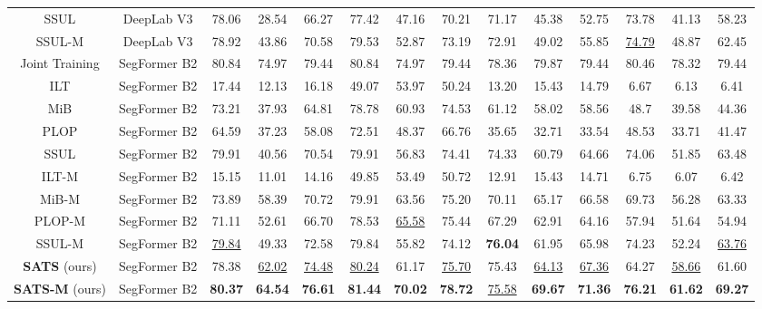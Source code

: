 \documentclass[onecolumn,conference,compsoc]{IEEEtran}
\begin{document}
\begin{spacing}{1.5}
\begin{table*}[t]
{\begin{tabular}{ c|c|ccc|ccc|ccc|ccc }
SSUL \cite{SSUL} & DeepLab V3 & 78.06 & 28.54 & 66.27 & 77.42 & 47.16 & 70.21 & 71.17 & 45.38 & 52.75 & 73.78 & 41.13 & 58.23\\
SSUL-M \cite{SSUL} & DeepLab V3 & 78.92 & 43.86 & 70.58 & 79.53 & 52.87 & 73.19 & 72.91 & 49.02 & 55.85 & \underline{74.79} & 48.87 & 62.45 \\
\midrule
Joint Training & SegFormer B2 & 80.84 & 74.97 & 79.44 & 80.84 & 74.97 & 79.44 & 78.36
& 79.87 & 79.44 & 80.46 & 78.32 & 79.44 \\
ILT \cite{ILT} & SegFormer B2 & 17.44 & 12.13 & 16.18 & 49.07 & 53.97 & 50.24 & 13.20 & 15.43 & 14.79 & 6.67 & 6.13 & 6.41 \\
MiB \cite{MiB} & SegFormer B2 & 73.21 & 37.93 & 64.81 & 78.78 & 60.93 & 74.53 & 61.12 & 58.02 & 58.56 & 48.7 & 39.58 & 44.36 \\
PLOP \cite{PLOP} & SegFormer B2 & 64.59 & 37.23 & 58.08 & 72.51 & 48.37 & 66.76 & 35.65 & 32.71 & 33.54 & 48.53 & 33.71 & 41.47 \\ 
SSUL \cite{SSUL} & SegFormer B2 & 79.91 & 40.56 & 70.54 & 79.91 & 56.83 & 74.41 & 74.33 & 60.79 & 64.66 & 74.06 & 51.85 & 63.48 \\
\midrule
ILT-M & SegFormer B2 & 15.15 & 11.01 & 14.16 & 49.85 & 53.49 & 50.72 & 12.91 & 15.43 & 14.71 & 6.75 & 6.07 & 6.42\\
MiB-M & SegFormer B2 & 73.89 & 58.39 & 70.72 & 79.91 & 63.56 & 75.20 & 70.11 & 65.17 & 66.58 & 69.73 & 56.28 & 63.33\\
PLOP-M & SegFormer B2 & 71.11 & 52.61 & 66.70 & 78.53 & \underline{65.58} & 75.44 & 67.29 & 62.91 & 64.16 & 57.94 & 51.64 & 54.94\\
SSUL-M & SegFormer B2 & \underline{79.84} & 49.33 & 72.58 & 79.84 & 55.82 & 74.12 & \textbf{76.04} & 61.95 & 65.98 & 74.23 & 52.24 & \underline{63.76} \\
\midrule
\textbf{SATS} (ours) & SegFormer B2 & 78.38 & \underline{62.02} & \underline{74.48} & \underline{80.24} & 61.17 & \underline{75.70} & 75.43 & \underline{64.13} & \underline{67.36} & 64.27 & \underline{58.66} & 61.60\\
\textbf{SATS-M} (ours) & SegFormer B2 & \textbf{80.37} & \textbf{64.54} & \textbf{76.61} & \textbf{81.44} & \textbf{70.02} & \textbf{78.72} & \underline{75.58} & \textbf{69.67} & \textbf{71.36} &  \textbf{76.21} & \textbf{61.62} & \textbf{69.27}\\
\bottomrule
\end{tabular}
} 

\label{tab:voc}
\end{table*}


\end{spacing}
\end{document}
